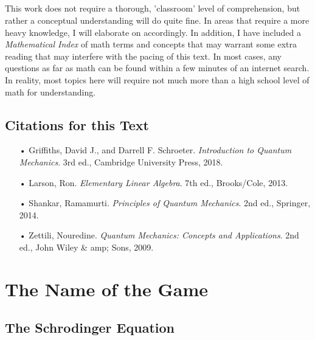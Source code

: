 \documentclass[12pt,letterpaper]{book}
\begin{document}
\paragraph*{}This work does not require a thorough, 'classroom' level of comprehension, but rather a conceptual understanding will do quite fine. In areas that require a more heavy knowledge, I will elaborate on accordingly. In addition, I have included a \textit{Mathematical Index} of math terms and concepts that may warrant some extra reading that may interfere with the pacing of this text. In most cases, any questions as far as math can be found within a few minutes of an internet search. In reality, most topics here will require not much more than a high school level of math for understanding. 


\section*{Citations for this Text}

\begin{itemize}
\item[•]Griffiths, David J., and Darrell F. Schroeter.\textit{ Introduction to Quantum Mechanics}. 3rd ed., Cambridge University Press, 2018.
\item[•]Larson, Ron. \textit{Elementary Linear Algebra}. 7th ed., Brooks/Cole, 2013.
\item[•]Shankar, Ramamurti. \textit{Principles of Quantum Mechanics}. 2nd ed., Springer, 2014.
\item[•]Zettili, Nouredine. \textit{Quantum Mechanics: Concepts and Applications}. 2nd ed., John Wiley \& amp; Sons, 2009.
\end{itemize}

\vspace{16cm}
\pagebreak


\chapter{The Name of the Game}


\section{The Schrodinger Equation}
\end{document}
